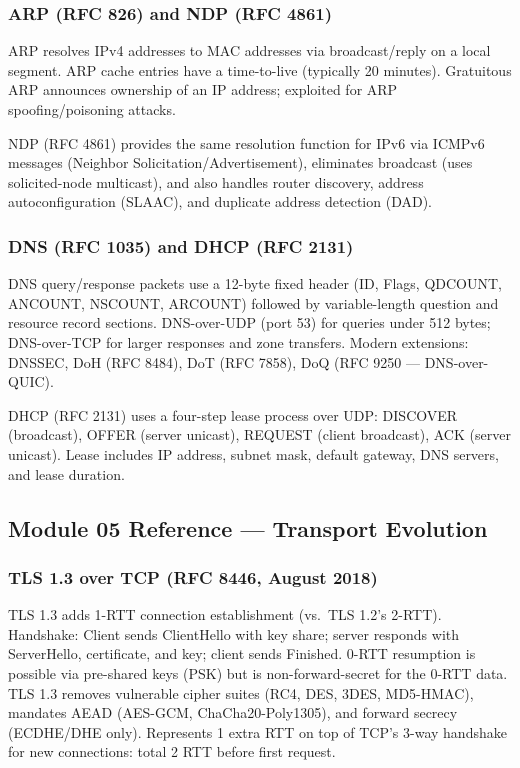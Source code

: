 \documentclass[11pt,letterpaper]{article}
\begin{document}
\subsubsection{ARP (RFC 826) and NDP (RFC 4861)}

ARP resolves IPv4 addresses to MAC addresses via broadcast/reply on a local segment. ARP cache entries have a time-to-live (typically 20 minutes). Gratuitous ARP announces ownership of an IP address; exploited for ARP spoofing/poisoning attacks.

NDP (RFC 4861) provides the same resolution function for IPv6 via ICMPv6 messages (Neighbor Solicitation/Advertisement), eliminates broadcast (uses solicited-node multicast), and also handles router discovery, address autoconfiguration (SLAAC), and duplicate address detection (DAD).

\subsubsection{DNS (RFC 1035) and DHCP (RFC 2131)}

DNS query/response packets use a 12-byte fixed header (ID, Flags, QDCOUNT, ANCOUNT, NSCOUNT, ARCOUNT) followed by variable-length question and resource record sections. DNS-over-UDP (port 53) for queries under 512 bytes; DNS-over-TCP for larger responses and zone transfers. Modern extensions: DNSSEC, DoH (RFC 8484), DoT (RFC 7858), DoQ (RFC 9250 --- DNS-over-QUIC).

DHCP (RFC 2131) uses a four-step lease process over UDP: DISCOVER (broadcast), OFFER (server unicast), REQUEST (client broadcast), ACK (server unicast). Lease includes IP address, subnet mask, default gateway, DNS servers, and lease duration.

\subsection{Module 05 Reference --- Transport Evolution}

\subsubsection{TLS 1.3 over TCP (RFC 8446, August 2018)}

TLS 1.3 adds 1-RTT connection establishment (vs.\ TLS 1.2's 2-RTT). Handshake: Client sends ClientHello with key share; server responds with ServerHello, certificate, and key; client sends Finished. 0-RTT resumption is possible via pre-shared keys (PSK) but is non-forward-secret for the 0-RTT data. TLS 1.3 removes vulnerable cipher suites (RC4, DES, 3DES, MD5-HMAC), mandates AEAD (AES-GCM, ChaCha20-Poly1305), and forward secrecy (ECDHE/DHE only). Represents 1 extra RTT on top of TCP's 3-way handshake for new connections: total 2 RTT before first request.
\end{document}

